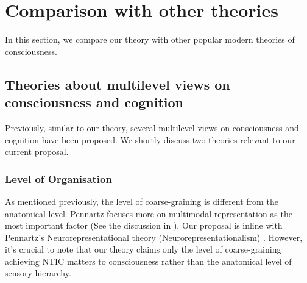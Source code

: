\documentclass[utf8]{article}
\begin{document}
	\section{Comparison with other theories}\label{sec:Comparison with other theories}
	In this section, we compare our theory with other popular modern theories of consciousness.
	
	
		\subsection{Theories about multilevel views on consciousness and cognition}
		Previously, similar to our theory, several multilevel views on consciousness and cognition have been proposed. We shortly discuss two theories relevant to our current proposal.
            \subsubsection*{Level of Organisation \cite{wimsatt1994ontology}}
                As mentioned previously, the level of coarse-graining is different from the anatomical level.
                Pennartz focuses more on multimodal representation as the most important factor (See the discussion in \cite{pennartz2015brain}). Our proposal is inline with Pennartz's Neurorepresentational  theory (Neurorepresentationalism) \cite{pennartz2018consciousness,pennartz2015brain}. However, it’s crucial to note that our theory claims only the level of coarse-graining achieving NTIC matters to consciousness rather than the anatomical level of sensory hierarchy. 
\end{document}
